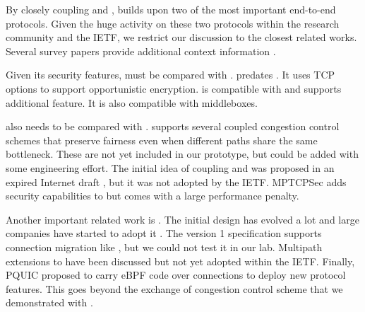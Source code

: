 
By closely coupling \tcp and \tls, \tcpls builds upon two of the most important end-to-end protocols. Given the huge activity on these two protocols within the research community and the IETF, we restrict our discussion to the closest
related works. Several survey papers provide additional context information \cite{polese2019survey,li2016multipath,papastergiou2016ossifying}.

Given its security features, \tcpls must be compared with \tcpcrypt \cite{bittau2010case,rfc8548}. \tcpcrypt predates . It uses TCP options to support opportunistic encryption. \tcpls is compatible with \tls and supports additional feature. It is also compatible with \tcp middleboxes.

\tcpls also needs to be compared with \mptcp \cite{raiciu2012hard,rfc6824}. \mptcp supports several coupled congestion control schemes \cite{peng2014multipath,wischik2011design,khalili2013mptcp} that preserve fairness even when different paths share the same bottleneck. These are not yet included in our \tcpls prototype, but could be added with some engineering effort. The initial idea of coupling \mptcp and \tls was proposed in an expired Internet draft \cite{draft-paasch-mptcp-ssl-00}, but it was not adopted by the IETF. MPTCPSec \cite{jadin2017securing} adds security capabilities to \mptcp but comes with a large performance penalty.

Another important related work is \quic. The initial design \cite{roskind2013quic} has evolved a lot and large companies have started to adopt it \cite{10.1145/3098822.3098842,Joras_mvfst,marx2020same}. The \quic version 1 specification \cite{draft-ietf-quic-transport} supports connection migration like \tcpls, but we could not test it in our lab. Multipath extensions \cite{viernickel2018multipath,de2017multipath,draft-deconinck-quic-multipath-06,draft-liu-multipath-quic-02} to \quic have been discussed but not yet adopted within the IETF. Finally, PQUIC \cite{de2019pluginizing} proposed to carry eBPF code over \quic connections to deploy new protocol features. This goes beyond the exchange of congestion control scheme that we demonstrated with \tcpls.







